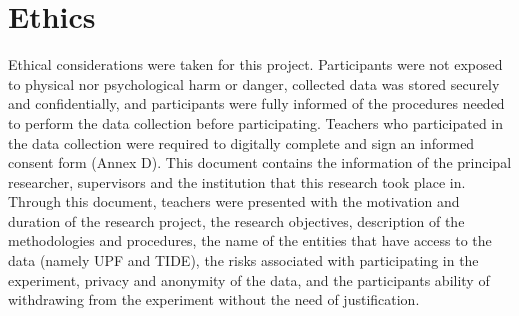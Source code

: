 \section{Ethics}
Ethical considerations were taken for this project. Participants were not exposed to physical nor psychological harm or danger, collected data was stored securely and confidentially, and participants were fully informed of the procedures needed to perform the data collection before participating. Teachers who participated in the data collection were required to digitally complete and sign an informed consent form (Annex D). This document contains the information of the principal researcher, supervisors and the institution that this research took place in. Through this document, teachers were presented with the motivation and duration of the research project, the research objectives, description of the methodologies and procedures, the name of the entities that have access to the data (namely UPF and TIDE), the risks associated with participating in the experiment, privacy and anonymity of the data, and the participants ability of withdrawing from the experiment without the need of justification.
\newpage


